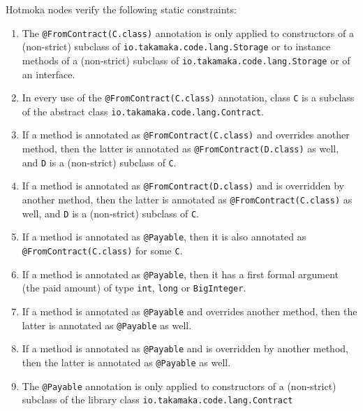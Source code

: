 Hotmoka nodes verify the following static constraints:
%
\begin{enumerate}
\item The \texttt{@FromContract(C.class)}
   	annotation is only applied to constructors of a
	(non-strict) subclass of \texttt{io.takamaka.code.lang.Storage}
	or to instance methods of a
 	(non-strict) subclass of \texttt{io.takamaka.code.lang.Storage} or of an interface.
\item In every use of the \texttt{@FromContract(C.class)}
	annotation, class \texttt{C} is a subclass
	of the abstract class \texttt{io.takamaka.code.lang.Contract}.
\item If a method is annotated as \texttt{@FromContract(C.class)}
	and overrides another method,
	then the latter is annotated as \texttt{@FromContract(D.class)} as well, and \texttt{D} is a
	(non-strict) subclass of \texttt{C}.
\item If a method is annotated as \texttt{@FromContract(D.class)}
	and is overridden by another method,
	then the latter is annotated as \texttt{@FromContract(C.class)} as well, and \texttt{D} is a
	(non-strict) subclass of \texttt{C}.
\item If a method is annotated as \texttt{@Payable}, then it is also annotated as
	\texttt{@FromContract(C.class)} for some \texttt{C}.
\item If a method is annotated as \texttt{@Payable}, then it has a first formal argument
	(the paid amount) of type \texttt{int}, \texttt{long} or \texttt{BigInteger}.
\item If a method is annotated as \texttt{@Payable} and overrides another method,
	then the latter is annotated as \texttt{@Payable} as well.
\item If a method is annotated as \texttt{@Payable} and is overridden by another method,
	then the latter is annotated as \texttt{@Payable} as well.
\item The \texttt{@Payable} annotation is only applied to constructors of a (non-strict) subclass of
	the library class \texttt{io.takamaka.code.lang.Contract}

\end{enumerate}
